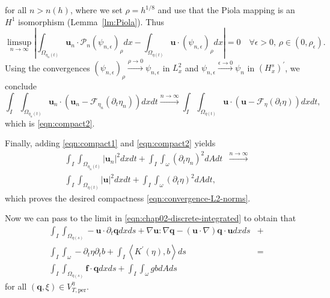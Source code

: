 \documentclass[10pt,a4paper]{article}
\numberwithin{equation}{section}
\begin{document}
for all $n>n(h)$, where we set $\rho=h^{1/8}$ and use that the Piola mapping is an $H^{1}$ isomorphism (Lemma~\ref{lm:Piola}). Thus
\[
\limsup_{n\to\infty}\left|\int_{\Omega_{\eta_{n}\left(t\right)}}\mathbf{u}_{n}\cdot\mathcal{P}_{n}\left(\psi_{n,\epsilon}\right)_{\rho}dx-\int_{\Omega_{\eta\left(t\right)}}\mathbf{u}\cdot\left(\psi_{n,\epsilon}\right)_{\rho}dx\right|=0\quad\forall\epsilon>0,\,\rho\in\left(0,\rho_{\epsilon}\right).
\]
Using the convergences $\left(\psi_{n,\epsilon}\right)_{\rho}\xrightarrow{\rho\to0}\psi_{n,\epsilon}$ in $L_{x}^{2}$ and $\psi_{n,\epsilon}\xrightarrow{\epsilon\to0}\psi_{n}$ in $\left(H_{x}^{s}\right)^{\prime}$, we conclude
\begin{equation}
\int_{I}\int_{\Omega_{\eta_{n}\left(t\right)}}\mathbf{u}_{n}\cdot\left(\mathbf{u}_{n}-\mathcal{F}_{\eta_{n}}\left(\partial_{t}\eta_{n}\right)\right)dxdt\xrightarrow{n\to\infty}\int_{I}\int_{\Omega_{\eta\left(t\right)}}\mathbf{u}\cdot\left(\mathbf{u}-\mathcal{F}_{\eta}\left(\partial_{t}\eta\right)\right)dxdt,
\end{equation}
which is \eqref{eqn:compact2}.

Finally, adding \eqref{eqn:compact1} and \eqref{eqn:compact2} yields
\begin{equation}
\begin{aligned}\int_{I}\int_{\Omega_{\eta_{n}\left(t\right)}}\left|\mathbf{u}_{n}\right|^{2}dxdt+\int_{I}\int_{\omega}\left(\partial_{t}\eta_{n}\right)^{2}dAdt & \xrightarrow{n\to\infty}\\
\int_{I}\int_{\Omega_{\eta\left(t\right)}}\left|\mathbf{u}\right|^{2}dxdt+\int_{I}\int_{\omega}\left(\partial_{t}\eta\right)^{2}dAdt,
\end{aligned}
\end{equation}
which proves the desired compactness \eqref{eqn:convergence-L2-norms}.

Now we can pass to the limit in \eqref{eqn:chap02-discrete-integrated} to obtain that 
\begin{equation}
   \begin{aligned}\int_{I}\int_{\Omega_{\eta\left(s\right)}}-\mathbf{u}\cdot\partial_{t}\mathbf{q}dxds+\nabla\mathbf{u}:\nabla\mathbf{q}-\left(\mathbf{u}\cdot\nabla\right)\mathbf{q}\cdot\mathbf{u}dxds & +\\
\int_{I}\int_{\omega}-\partial_{t}\eta\partial_{t}b+\int_{I}\left\langle K^{\prime}\left(\eta\right),b\right\rangle ds & =\\
\int_{I}\int_{\Omega_{\eta\left(s\right)}}\mathbf{f}\cdot\mathbf{q}dxds+\int_{I}\int_{\omega}gbdAds
\end{aligned}
\end{equation}
for all $\left(\mathbf{q},\xi\right)\in V_{T,\text{per}}^{\eta}$.
\end{document}
